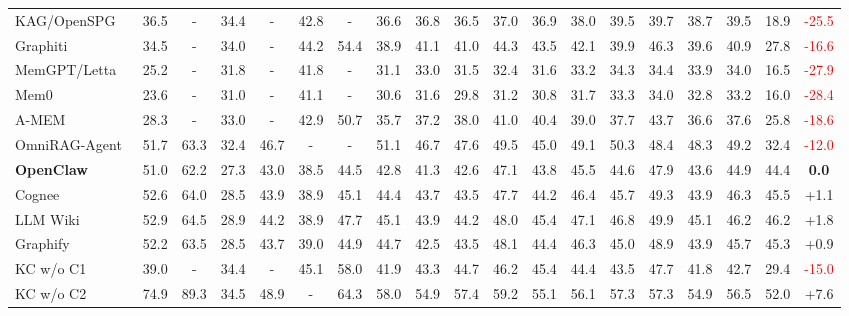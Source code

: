 \documentclass{article}
\begin{document}
\begin{table}[t]
{\begin{tabular}{l|cccccc|cccccccccc|cc}
\rowcolor{teal!14} KAG/OpenSPG~\citep{KAG} & 36.5 & - & 34.4 & - & 42.8 & - & 36.6 & 36.8 & 36.5 & 37.0 & 36.9 & 38.0 & 39.5 & 39.7 & 38.7 & 39.5 & 18.9 & \textcolor{red}{-25.5} \\
\rowcolor{teal!14} Graphiti~\citep{Graphiti} & 34.5 & - & 34.0 & - & 44.2 & 54.4 & 38.9 & 41.1 & 41.0 & 44.3 & 43.5 & 42.1 & 39.9 & 46.3 & 39.6 & 40.9 & 27.8 & \textcolor{red}{-16.6} \\
\rowcolor{orange!8} MemGPT/Letta~\citep{MemGPT} & 25.2 & - & 31.8 & - & 41.8 & - & 31.1 & 33.0 & 31.5 & 32.4 & 31.6 & 33.2 & 34.3 & 34.4 & 33.9 & 34.0 & 16.5 & \textcolor{red}{-27.9} \\
\rowcolor{orange!8} Mem0~\citep{Mem0} & 23.6 & - & 31.0 & - & 41.1 & - & 30.6 & 31.6 & 29.8 & 31.2 & 30.8 & 31.7 & 33.3 & 34.0 & 32.8 & 33.2 & 16.0 & \textcolor{red}{-28.4} \\
\rowcolor{orange!8} A-MEM~\citep{A-MEM} & 28.3 & - & 33.0 & - & 42.9 & 50.7 & 35.7 & 37.2 & 38.0 & 41.0 & 40.4 & 39.0 & 37.7 & 43.7 & 36.6 & 37.6 & 25.8 & \textcolor{red}{-18.6} \\
\rowcolor{yellow!12} OmniRAG-Agent~\citep{OmniRAG-Agent} & 51.7 & 63.3 & 32.4 & 46.7 & - & - & 51.1 & 46.7 & 47.6 & 49.5 & 45.0 & 49.1 & 50.3 & 48.4 & 48.3 & 49.2 & 32.4 & \textcolor{red}{-12.0} \\
\rowcolor{green!8} \textbf{OpenClaw}~\citep{OpenClaw} & 51.0 & 62.2 & 27.3 & 43.0 & 38.5 & 44.5 & 42.8 & 41.3 & 42.6 & 47.1 & 43.8 & 45.5 & 44.6 & 47.9 & 43.6 & 44.9 & 44.4 & \textbf{0.0} \\
\rowcolor{green!8} Cognee~\citep{Cognee} & 52.6 & 64.0 & 28.5 & 43.9 & 38.9 & 45.1 & 44.4 & 43.7 & 43.5 & 47.7 & 44.2 & 46.4 & 45.7 & 49.3 & 43.9 & 46.3 & 45.5 & \textcolor{green!60!black}{+1.1} \\
\rowcolor{green!8} LLM Wiki~\citep{LLMWiki} & 52.9 & 64.5 & 28.9 & 44.2 & 38.9 & 47.7 & 45.1 & 43.9 & 44.2 & 48.0 & 45.4 & 47.1 & 46.8 & 49.9 & 45.1 & 46.2 & 46.2 & \textcolor{green!60!black}{+1.8} \\
\rowcolor{green!8} Graphify~\citep{Graphify} & 52.2 & 63.5 & 28.5 & 43.7 & 39.0 & 44.9 & 44.7 & 42.5 & 43.5 & 48.1 & 44.4 & 46.3 & 45.0 & 48.9 & 43.9 & 45.7 & 45.3 & \textcolor{green!60!black}{+0.9} \\
\midrule
\rowcolor{red!8} KC w/o C1 & 39.0 & - & 34.4 & - & 45.1 & 58.0 & 41.9 & 43.3 & 44.7 & 46.2 & 45.4 & 44.4 & 43.5 & 47.7 & 41.8 & 42.7 & 29.4 & \textcolor{red}{-15.0} \\
\rowcolor{red!8} KC w/o C2 & 74.9 & 89.3 & 34.5 & 48.9 & - & 64.3 & 58.0 & 54.9 & 57.4 & 59.2 & 55.1 & 56.1 & 57.3 & 57.3 & 54.9 & 56.5 & 52.0 & \textcolor{green!60!black}{+7.6} \\

\end{tabular}}
\end{table}
\end{document}
